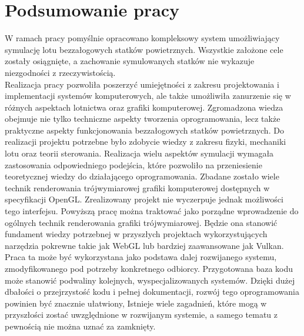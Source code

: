 \chapter{Podsumowanie pracy}


W ramach pracy pomyślnie opracowano kompleksowy system umożliwiający symulację lotu bezzałogowych statków powietrznych. Wszystkie założone cele zostały osiągnięte, a zachowanie symulowanych statków nie wykazuje niezgodności z rzeczywistością.\\

Realizacja pracy pozwoliła poszerzyć umiejętności z zakresu projektowania i implementacji systemów komputerowych, ale także umożliwiła zanurzenie się w różnych aspektach lotnictwa oraz grafiki komputerowej. Zgromadzona wiedza obejmuje nie tylko techniczne aspekty tworzenia oprogramowania, lecz także praktyczne aspekty funkcjonowania bezzałogowych statków powietrznych. Do realizacji projektu potrzebne było zdobycie wiedzy z zakresu fizyki, mechaniki lotu oraz teorii sterowania. Realizacja wielu aspektów symulacji wymagała zastosowania odpowiedniego podejścia, które pozwoliło na przeniesienie teoretycznej wiedzy do działającego oprogramowania. Zbadane zostało wiele technik renderowania trójwymiarowej grafiki komputerowej dostępnych w specyfikacji OpenGL. Zrealizowany projekt nie wyczerpuje jednak możliwości tego interfejsu. Powyższą pracę można traktować jako porządne wprowadzenie do ogólnych technik renderowania grafiki trójwymiarowej. Będzie ona stanowić fundament wiedzy potrzebnej w przyszłych projektach wykorzystujących narzędzia pokrewne takie jak WebGL lub bardziej zaawansowane jak Vulkan. \\

Praca ta może być wykorzystana jako podstawa dalej rozwijanego systemu, zmodyfikowanego pod potrzeby konkretnego odbiorcy. Przygotowana baza kodu może stanowić podwaliny kolejnych, wyspecjalizowanych systemów. Dzięki dużej dbałości o przejrzystość kodu i pełnej dokumentacji, rozwój tego oprogramowania powinien być znacznie ułatwiony, Istnieje wiele zagadnień, które mogą w przyszłości zostać uwzględnione w rozwijanym systemie, a samego tematu z pewnością nie można uznać za zamknięty.